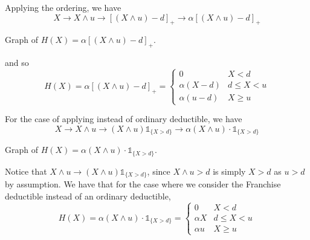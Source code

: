 \documentclass[notoc,notitlepage]{tufte-book}
\begin{document}
Applying the ordering, we have
\begin{equation*}
  X \to X \land u \to {[ (X \land u) - d ]}_+ \to \alpha {[ ( X \land u ) - d ]}_+
\end{equation*}
\begin{marginfigure}
  \caption{Graph of $H(X) = \alpha{[ (X \land u) - d ]}_+$.}\label{fig:graph_of_mutiple_adjustments}
\end{marginfigure}
and so
\begin{equation*}
  H(X) = \alpha {[ (X \land u) - d ]}_+ = \begin{cases}
    0               & X < d \\
    \alpha( X - d ) & d \leq X < u \\
    \alpha( u - d ) & X \geq u
  \end{cases}
\end{equation*}

For the case of applying  instead of ordinary deductible, we have
\begin{equation*}
  X \to X \land u \to ( X \land u ) \mathbb{1}_{\{X > d\}} \to \alpha(X \land u) \cdot \mathbb{1}_{\{X > d\}}
\end{equation*}
\begin{marginfigure}
  \caption{Graph of $H(X) = \alpha( X \land u ) \cdot \mathbb{1}_{\{X > d\}}$.}\label{fig:graph_of_mutiple_adjustments_with_franchise_deductible}
\end{marginfigure}
Notice that $X \land u \to (X \land u) \mathbb{1}_{\{X > d\}}$, since $X \land u > d$ is simply $X > d$ as $u > d$ by assumption. We have that for the case where we consider the Franchise deductible instead of an ordinary deductible,
\begin{equation*}\label{eq}
  H(X) = \alpha( X \land u ) \cdot \mathbb{1}_{\{X > d\}} = \begin{cases}
    0        & X < d \\
    \alpha X & d \leq X < u \\
    \alpha u & X \geq u
  \end{cases}
\end{equation*}
\end{document}
